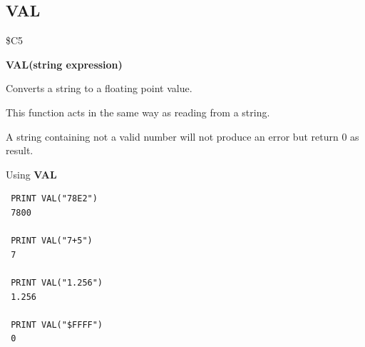 
\newpage
\subsection{VAL}
\begin{description}[leftmargin=2cm,style=nextline]
\item [Token:] \$C5
\item [Format:] {\bf VAL(string expression)}
\item [Usage:] Converts a string to a floating point value.

               This function acts in the same way as reading from a string.

\item [Remarks:] A string containing not a valid number
                 will not produce an error but return 0 as result.

\item [Example:] Using {\bf VAL}
\begin{tcolorbox}[colback=black,coltext=white]
\verbatimfont{\codefont}
\begin{verbatim}
 PRINT VAL("78E2")
 7800

 PRINT VAL("7+5")
 7

 PRINT VAL("1.256")
 1.256

 PRINT VAL("$FFFF")
 0
\end{verbatim}
\end{tcolorbox}
\end{description}


\newpage
